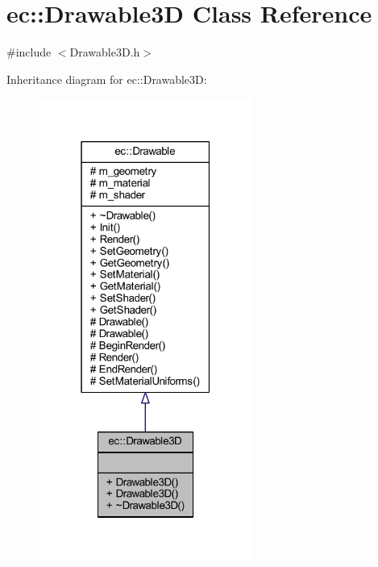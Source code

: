 \hypertarget{classec_1_1_drawable3_d}{}\section{ec\+:\+:Drawable3D Class Reference}
\label{classec_1_1_drawable3_d}


{\ttfamily \#include $<$Drawable3\+D.\+h$>$}



Inheritance diagram for ec\+:\+:Drawable3D\+:
\nopagebreak
\begin{figure}[H]
\begin{center}
\leavevmode
\includegraphics[width=199pt]{classec_1_1_drawable3_d__inherit__graph}
\end{center}
\end{figure}


